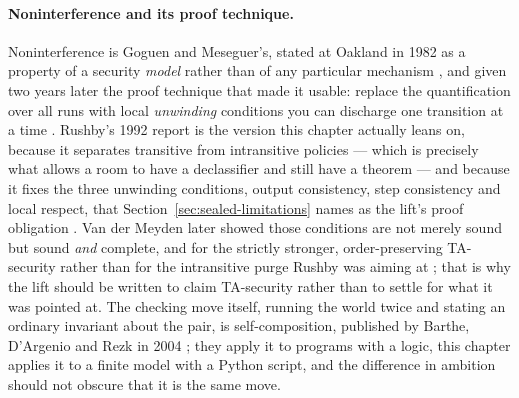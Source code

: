 \documentclass[11pt,a4paper]{article}
\theoremstyle{definition}
\begin{document}
\paragraph{Noninterference and its proof technique.}
Noninterference is Goguen and Meseguer's, stated at Oakland in 1982 as a
property of a security \emph{model} rather than of any particular mechanism
, and given two years later the proof technique that
made it usable: replace the quantification over all runs with local
\emph{unwinding} conditions you can discharge one transition at a time
. Rushby's 1992 report is the version this chapter
actually leans on, because it separates transitive from intransitive policies
--- which is precisely what allows a room to have a declassifier and still have
a theorem --- and because it fixes the three unwinding conditions, output
consistency, step consistency and local respect, that
Section~\ref{sec:sealed-limitations} names as the lift's proof obligation
. Van der Meyden later showed those conditions are not merely
sound but sound \emph{and} complete, and for the strictly stronger,
order-preserving TA-security rather than for the intransitive purge Rushby was
aiming at ; that is why the lift should be written to claim
TA-security rather than to settle for what it was pointed at. The checking
move itself, running the world twice and stating an ordinary invariant about
the pair, is self-composition, published by Barthe, D'Argenio and Rezk in 2004
; they apply it to programs with a logic, this chapter applies it
to a finite model with a Python script, and the difference in ambition should
not obscure that it is the same move.
\end{document}
